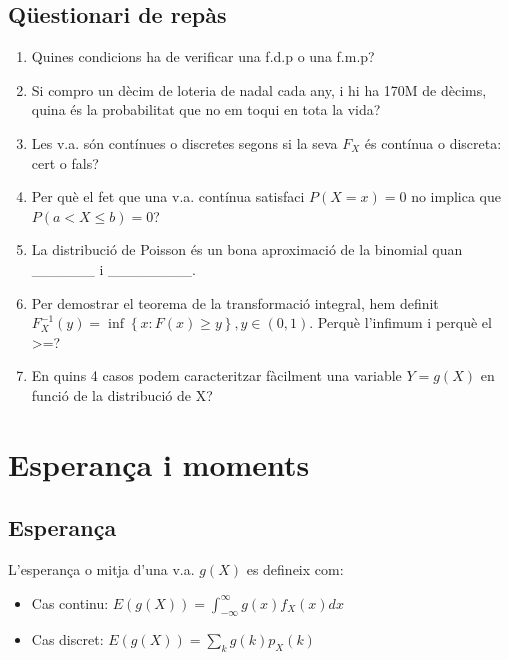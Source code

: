 \documentclass[letterpaper,10pt,english]{sphinxmanual}
\begin{document}
\subsection{Qüestionari de repàs}
\label{\detokenize{0_Intro/0_1_Repas_probabilitat:id1}}\begin{enumerate}
%
\item {} 
Quines condicions ha de verificar una f.d.p o una f.m.p?

\item {} 
Si compro un dècim de loteria de nadal cada any, i hi ha 170M de dècims, quina és la probabilitat que no em toqui en tota la vida?

\item {} 
Les v.a. són contínues o discretes segons si la seva \(F_X\) és contínua o discreta: cert o fals?

\item {} 
Per què el fet que una v.a. contínua satisfaci \(P(X=x)=0\) no implica que \(P(a < X \leq b)=0\)?

\item {} 
La distribució de Poisson és un bona aproximació de la binomial quan \_\_\_\_\_\_ i \_\_\_\_\_\_\_\_.

\item {} 
Per demostrar el teorema de la transformació integral, hem definit \(F_X^{-1}\left(y\right) = \inf \left\{x : F\left(x\right) \geq y \right\}, y \in (0, 1)\). Perquè l’infimum i perquè el \textgreater{}=?

\item {} 
En quins 4 casos podem caracteritzar fàcilment una variable \(Y=g(X)\) en funció de la distribució de X?

\end{enumerate}


\section{Esperança i moments}
\label{\detokenize{0_Intro/0_1_Repas_probabilitat:esperanca-i-moments}}

\subsection{Esperança}
\label{\detokenize{0_Intro/0_1_Repas_probabilitat:esperanca}}
L’esperança o mitja d’una v.a. \(g\left(X\right)\) es defineix com:
\begin{itemize}
\item {} 
Cas continu: \(E\left(g\left(X\right)\right) = \int_{-\infty}^{\infty} g\left(x\right)f_X\left(x\right)dx\)

\item {} 
Cas discret: \(E\left(g\left(X\right)\right) = \sum_{k} g\left(k\right)p_X\left(k\right)\)

\end{itemize}
\end{document}
